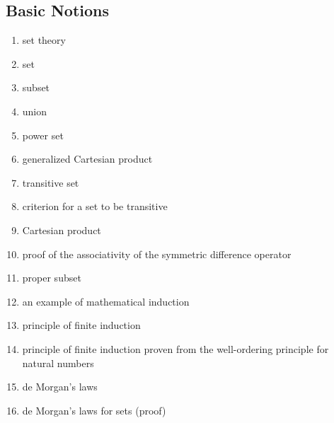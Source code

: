 \documentclass[12pt]{article}
\begin{document}
\begin{multicols}{2}

\section{Basic Notions}
\begin{enumerate}
\item set theory
\item set
\item subset
\item union
\item power set 
\item generalized Cartesian product
\item transitive set
\item criterion for a set to be transitive
\item Cartesian product
\item proof of the associativity of the symmetric difference operator
\item proper subset 
\item an example of mathematical induction
\item principle of finite induction
\item principle of finite induction proven from the well-ordering principle for natural numbers  
\item de Morgan's laws
\item de Morgan's laws for sets (proof)
\end{enumerate}


\end{multicols}
\end{document}
